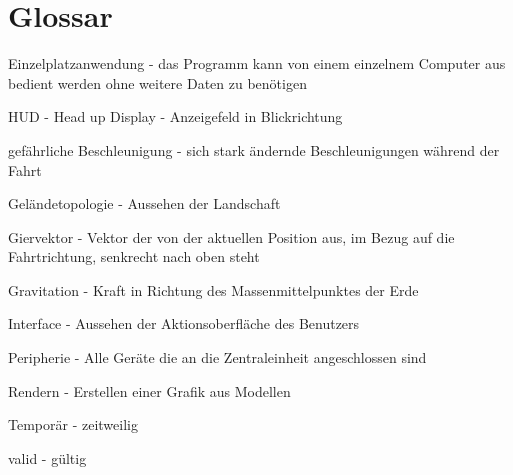 
\chapter{Glossar}

Einzelplatzanwendung - das Programm kann von einem einzelnem Computer aus bedient werden ohne weitere Daten zu benötigen

HUD  - Head up Display - Anzeigefeld in Blickrichtung

gefährliche Beschleunigung - sich stark ändernde Beschleunigungen während der Fahrt

Geländetopologie - Aussehen der Landschaft

Giervektor - Vektor der von der aktuellen Position aus, im Bezug auf die Fahrtrichtung, senkrecht nach oben steht

Gravitation - Kraft in Richtung des Massenmittelpunktes der Erde

Interface - Aussehen der Aktionsoberfläche des Benutzers 

Peripherie - Alle Geräte die an die Zentraleinheit angeschlossen sind

Rendern - Erstellen einer Grafik aus Modellen

Temporär - zeitweilig

valid - gültig


%

